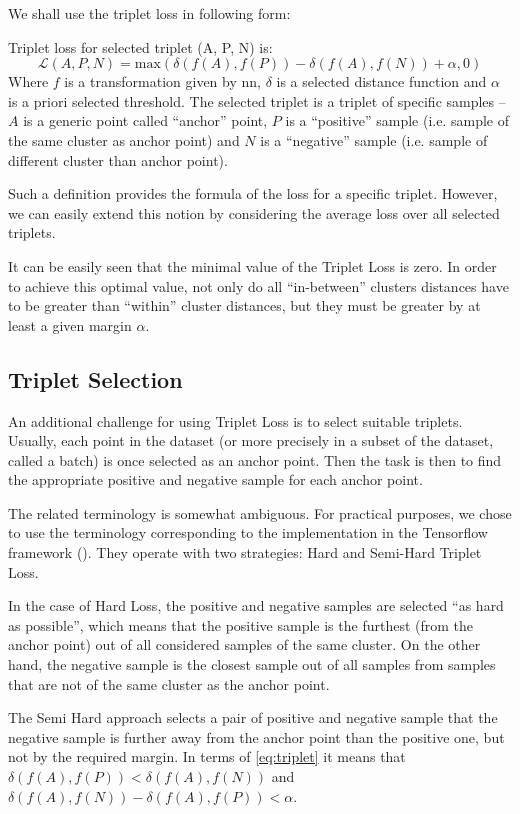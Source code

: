 We shall use the triplet loss in following form:
\begin{defn}
Triplet loss for selected triplet (A, P, N) is:
\begin{equation}
\mathcal{L}(A, P, N) = \text{max}(\delta(f(A), f(P)) - \delta(f(A), f(N)) + \alpha, 0)
\label{eq:triplet}
\end{equation}
Where $f$ is a transformation given by \gls{nn}, $\delta$
is a selected distance function and $\alpha$ is a priori selected threshold. The
selected triplet is a triplet of specific samples -- $A$ is a generic point
called ``anchor'' point, $P$ is a ``positive'' sample (i.e. sample of the same
cluster as anchor point) and $N$ is a ``negative'' sample (i.e. sample of
different cluster than anchor point).
\end{defn}


Such a definition provides the formula of the loss for a specific triplet. However, we can easily extend this notion by considering the average loss over all selected triplets.

It can be easily seen that the minimal value of the Triplet Loss is zero. In order to achieve this optimal value, not only do all ``in-between'' clusters distances have to be greater than ``within'' cluster distances, but they must be greater by at least a given margin $\alpha$.

\subsection{Triplet Selection}

An additional challenge for using Triplet Loss is to select suitable triplets. Usually, each point in the dataset (or more precisely in a subset of the dataset, called a batch) is once selected as an anchor point. Then the task is then to find the appropriate positive and negative sample for each anchor point.

The related terminology is somewhat ambiguous. For practical purposes, we chose to use the terminology corresponding to the implementation in the Tensorflow framework (\cite{tensorflow}). They operate with two strategies: Hard and Semi-Hard Triplet Loss.

In the case of Hard Loss, the positive and negative samples are selected ``as hard as possible'', which means that the positive sample is the furthest (from the anchor point) out of all considered samples of the same cluster. On the other hand, the negative sample is the closest sample out of all samples from samples that are not of the same cluster as the anchor point.

The Semi Hard approach selects a pair of positive and negative sample that the negative sample is further away from the anchor point than the positive one, but not by the required margin. In terms of \autoref{eq:triplet} it means that $\delta(f(A), f(P)) < \delta(f(A), f(N))$ and $\delta(f(A), f(N)) - \delta(f(A), f(P)) < \alpha$.